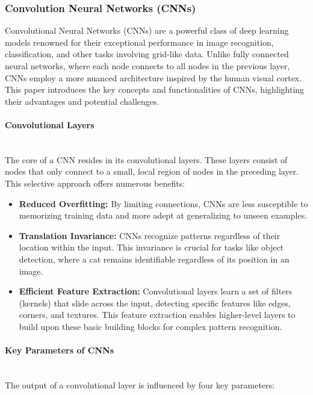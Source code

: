 \subsubsection{Convolution Neural Networks (CNNs) \cite{manilow2020}}

Convolutional Neural Networks (CNNs) are a powerful class of deep learning models renowned for their exceptional performance in image recognition, classification, and other tasks involving grid-like data. Unlike fully connected neural networks, where each node connects to all nodes in the previous layer, CNNs employ a more nuanced architecture inspired by the human visual cortex. This paper introduces the key concepts and functionalities of CNNs, highlighting their advantages and potential challenges.

\paragraph{Convolutional Layers}\mbox{}\\
The core of a CNN resides in its convolutional layers. These layers consist of nodes that only connect to a small, local region of nodes in the preceding layer. This selective approach offers numerous benefits:

\begin{itemize}
    \item \textbf{Reduced Overfitting:} By limiting connections, CNNs are less susceptible to memorizing training data and more adept at generalizing to unseen examples.
    \item \textbf{Translation Invariance:} CNNs recognize patterns regardless of their location within the input. This invariance is crucial for tasks like object detection, where a cat remains identifiable regardless of its position in an image.
    \item \textbf{Efficient Feature Extraction:} Convolutional layers learn a set of filters (kernels) that slide across the input, detecting specific features like edges, corners, and textures. This feature extraction enables higher-level layers to build upon these basic building blocks for complex pattern recognition.
\end{itemize}

\paragraph{Key Parameters of CNNs}\mbox{}\\
The output of a convolutional layer is influenced by four key parameters:

